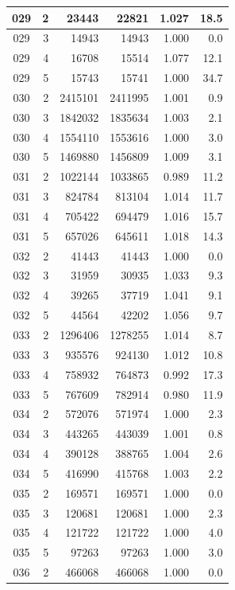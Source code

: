 \begin{longtable}{|c|r|r|r|r|r|}
\hline
029 & 2 & 23443 & 22821 & 1.027 & 18.5 \\
\hline
029 & 3 & 14943 & 14943 & 1.000 & 0.0 \\
\hline
029 & 4 & 16708 & 15514 & 1.077 & 12.1 \\
\hline
029 & 5 & 15743 & 15741 & 1.000 & 34.7 \\
\hline
030 & 2 & 2415101 & 2411995 & 1.001 & 0.9 \\
\hline
030 & 3 & 1842032 & 1835634 & 1.003 & 2.1 \\
\hline
030 & 4 & 1554110 & 1553616 & 1.000 & 3.0 \\
\hline
030 & 5 & 1469880 & 1456809 & 1.009 & 3.1 \\
\hline
031 & 2 & 1022144 & 1033865 & 0.989 & 11.2 \\
\hline
031 & 3 & 824784 & 813104 & 1.014 & 11.7 \\
\hline
031 & 4 & 705422 & 694479 & 1.016 & 15.7 \\
\hline
031 & 5 & 657026 & 645611 & 1.018 & 14.3 \\
\hline
032 & 2 & 41443 & 41443 & 1.000 & 0.0 \\
\hline
032 & 3 & 31959 & 30935 & 1.033 & 9.3 \\
\hline
032 & 4 & 39265 & 37719 & 1.041 & 9.1 \\
\hline
032 & 5 & 44564 & 42202 & 1.056 & 9.7 \\
\hline
033 & 2 & 1296406 & 1278255 & 1.014 & 8.7 \\
\hline
033 & 3 & 935576 & 924130 & 1.012 & 10.8 \\
\hline
033 & 4 & 758932 & 764873 & 0.992 & 17.3 \\
\hline
033 & 5 & 767609 & 782914 & 0.980 & 11.9 \\
\hline
034 & 2 & 572076 & 571974 & 1.000 & 2.3 \\
\hline
034 & 3 & 443265 & 443039 & 1.001 & 0.8 \\
\hline
034 & 4 & 390128 & 388765 & 1.004 & 2.6 \\
\hline
034 & 5 & 416990 & 415768 & 1.003 & 2.2 \\
\hline
035 & 2 & 169571 & 169571 & 1.000 & 0.0 \\
\hline
035 & 3 & 120681 & 120681 & 1.000 & 2.3 \\
\hline
035 & 4 & 121722 & 121722 & 1.000 & 4.0 \\
\hline
035 & 5 & 97263 & 97263 & 1.000 & 3.0 \\
\hline
036 & 2 & 466068 & 466068 & 1.000 & 0.0 \\

\end{longtable}

